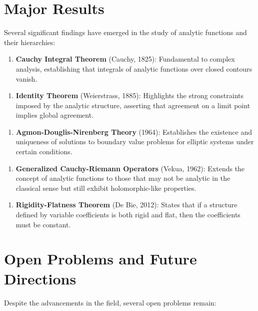 \documentclass[11pt,a4paper]{article}
\begin{document}
\section{Major Results}

Several significant findings have emerged in the study of analytic functions and their hierarchies:

\begin{enumerate}
\item \textbf{Cauchy Integral Theorem} (Cauchy, 1825): Fundamental to complex analysis, establishing that integrals of analytic functions over closed contours vanish.
\end{enumerate}

\begin{enumerate}
\item \textbf{Identity Theorem} (Weierstrass, 1885): Highlights the strong constraints imposed by the analytic structure, asserting that agreement on a limit point implies global agreement.
\end{enumerate}

\begin{enumerate}
\item \textbf{Agmon-Douglis-Nirenberg Theory} (1964): Establishes the existence and uniqueness of solutions to boundary value problems for elliptic systems under certain conditions.
\end{enumerate}

\begin{enumerate}
\item \textbf{Generalized Cauchy-Riemann Operators} (Vekua, 1962): Extends the concept of analytic functions to those that may not be analytic in the classical sense but still exhibit holomorphic-like properties.
\end{enumerate}

\begin{enumerate}
\item \textbf{Rigidity-Flatness Theorem} (De Bie, 2012): States that if a structure defined by variable coefficients is both rigid and flat, then the coefficients must be constant.
\end{enumerate}

\section{Open Problems and Future Directions}

Despite the advancements in the field, several open problems remain:
\end{document}
